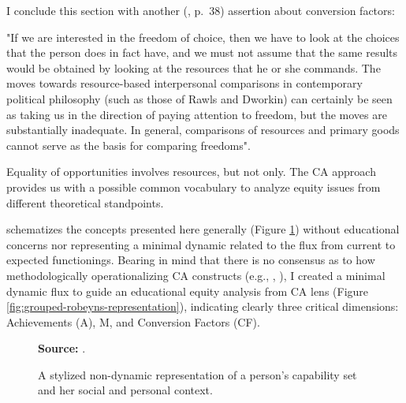 I conclude this section with another  (\citeyear{sen:1992}, p.~38) assertion about conversion factors: 
\begin{citacao}
    "If we are interested in the freedom of choice, then we have to look at the choices that the person does in fact have, and we must not assume that the same results would be obtained by looking at the resources that he or she commands. The moves towards resource-based interpersonal comparisons in contemporary political philosophy (such as those of Rawls and Dworkin) can certainly be seen as taking us in the direction of paying attention to freedom, but the moves are substantially inadequate. In general, comparisons of resources and primary goods cannot serve as the basis for comparing freedoms".
\end{citacao}
Equality of opportunities involves resources, but not only. The \gls{CA} approach provides us with a possible common vocabulary to analyze equity issues from different theoretical standpoints. 

 schematizes the concepts presented here generally (Figure \ref{fig:robeyns-representation}) without educational concerns nor representing a minimal dynamic related to the flux from current to expected functionings. Bearing in mind that there is no consensus as to how methodologically operationalizing \gls{CA} constructs (e.g., , ), I created a minimal dynamic flux to guide an educational equity analysis from \gls{CA} lens (Figure \ref{fig:grouped-robeyns-representation}), indicating clearly three critical dimensions: Achievements (\acrshort{A}), \acrfull{M}, and Conversion Factors (\acrshort{CF}). 

\begin{figure}[ht!]
\centering

\caption{\textmd{A stylized non-dynamic representation of a person's capability set and her social and personal context.}}
\label{fig:robeyns-representation}

\par\medskip\ABNTEXfontereduzida\selectfont\textbf{Source:} .
\end{figure}

